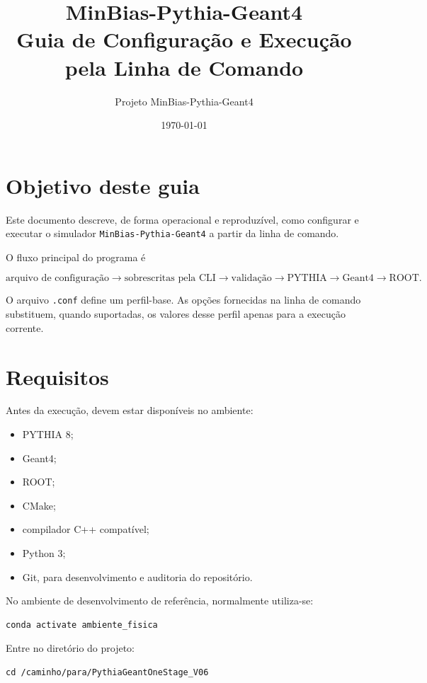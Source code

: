 \documentclass[11pt,a4paper]{article}
\title{\textbf{MinBias-Pythia-Geant4}\\
Guia de Configuração e Execução pela Linha de Comando}
\author{Projeto MinBias-Pythia-Geant4}
\date{\today}
\begin{document}
\maketitle
\tableofcontents
\newpage

\section{Objetivo deste guia}

Este documento descreve, de forma operacional e reproduzível, como configurar e
executar o simulador \texttt{MinBias-Pythia-Geant4} a partir da linha de comando.

O fluxo principal do programa é

\[
\text{arquivo de configuração}
\longrightarrow
\text{sobrescritas pela CLI}
\longrightarrow
\text{validação}
\longrightarrow
\text{PYTHIA}
\longrightarrow
\text{Geant4}
\longrightarrow
\text{ROOT}.
\]

O arquivo \texttt{.conf} define um perfil-base. As opções fornecidas na linha de
comando substituem, quando suportadas, os valores desse perfil apenas para a
execução corrente.

\section{Requisitos}

Antes da execução, devem estar disponíveis no ambiente:

\begin{itemize}
  \item PYTHIA 8;
  \item Geant4;
  \item ROOT;
  \item CMake;
  \item compilador C++ compatível;
  \item Python 3;
  \item Git, para desenvolvimento e auditoria do repositório.
\end{itemize}

No ambiente de desenvolvimento de referência, normalmente utiliza-se:

\begin{lstlisting}[style=shell]
conda activate ambiente_fisica
\end{lstlisting}

Entre no diretório do projeto:

\begin{lstlisting}[style=shell]
cd /caminho/para/PythiaGeantOneStage_V06
\end{lstlisting}
\end{document}
